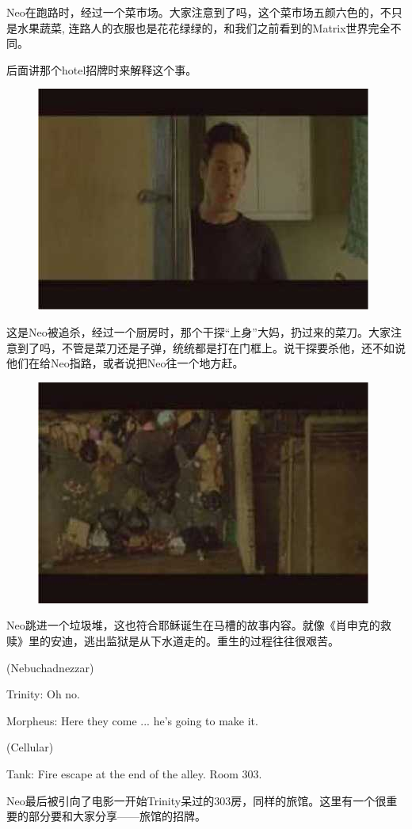 \documentclass[UTF8]{ctexart}
\newenvironment{myquote}{\color{green} \setlength{\leftskip}{6em} \setlength{\rightskip}{4em} \setlength{\parindent}{-2em}}{\par}
\begin{document}
Neo在跑路时，经过一个菜市场。大家注意到了吗，这个菜市场五颜六色的，不只是水果蔬菜, 连路人的衣服也是花花绿绿的，和我们之前看到的Matrix世界完全不同。

后面讲那个hotel招牌时来解释这个事。

\begin{figure}[htb]
\centering
\includegraphics[width=0.5\linewidth]{fig/read_Matrix-79}
\end{figure}

这是Neo被追杀，经过一个厨房时，那个干探“上身”大妈，扔过来的菜刀。大家注意到了吗，不管是菜刀还是子弹，统统都是打在门框上。说干探要杀他，还不如说他们在给Neo指路，或者说把Neo往一个地方赶。

\begin{figure}[htb]
\centering
\includegraphics[width=0.5\linewidth]{fig/read_Matrix-80}
\end{figure}

Neo跳进一个垃圾堆，这也符合耶稣诞生在马槽的故事内容。就像《肖申克的救赎》里的安迪，逃出监狱是从下水道走的。重生的过程往往很艰苦。

\begin{myquote}
(Nebuchadnezzar)

Trinity: Oh no.

Morpheus: Here they come ... he's going to make it.

(Cellular)

Tank: Fire escape at the end of the alley. Room 303.
\end{myquote}

Neo最后被引向了电影一开始Trinity呆过的303房，同样的旅馆。这里有一个很重要的部分要和大家分享——旅馆的招牌。
\end{document}
